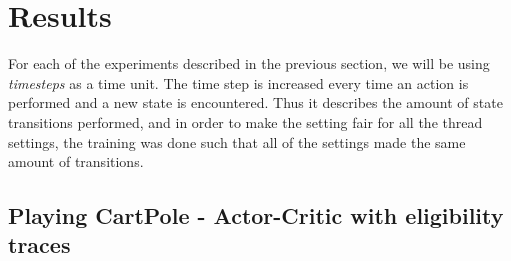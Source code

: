 \documentclass[11pt]{article}
\begin{document}
\section{Results}

For each of the experiments described in the previous section, we will be using
\textit{timesteps} as a time unit.
The time step is increased every time an action is performed and a new state is encountered.
Thus it describes the amount of state transitions performed, and in order to make the setting
fair for all the thread settings, the training was done such that all of the settings
made the same amount of transitions.

\subsection{Playing CartPole - Actor-Critic with eligibility traces}
\end{document}
